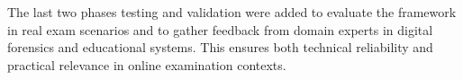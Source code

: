 The last two phases testing and validation were added to evaluate the framework in real exam scenarios and to gather feedback from domain experts in digital forensics and educational systems. This ensures both technical reliability and practical relevance in online examination contexts.

